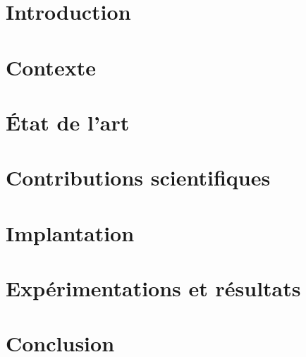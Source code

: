 \documentclass[final,12pt,doubleside]{book}
\begin{document}
	\dominitoc
	\frontmatter
\completetable
	
\mainmatter

\chapter{Introduction}
\chaptertable

\chapter{Contexte}
\chaptertable

\chapter{État de l'art}
\chaptertable

\chapter{Contributions scientifiques}
\chaptertable

\chapter{Implantation}
\chaptertable

\chapter{Expérimentations et résultats}
\chaptertable

\chapter{Conclusion}
\chaptertable


\backmatter


%	

\end{document}
